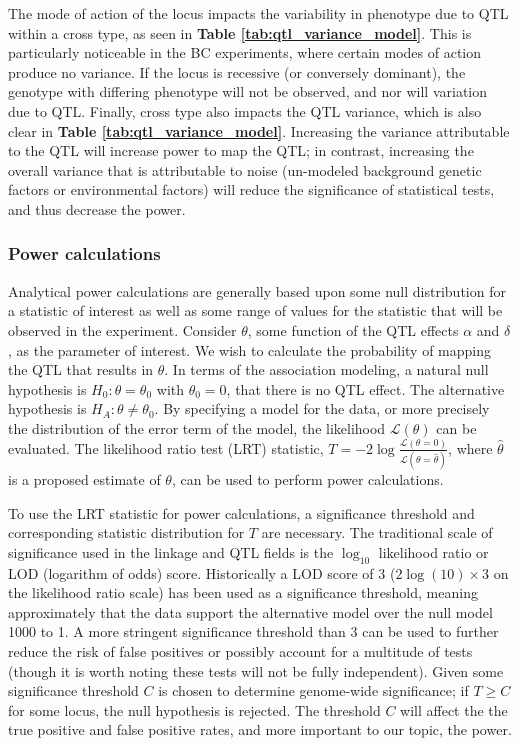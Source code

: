 The mode of action of the locus impacts the variability in phenotype due to QTL within a cross type, as seen in \textbf{Table \ref{tab:qtl_variance_model}}. This is particularly noticeable in the BC experiments, where certain modes of action produce no variance. If the locus is recessive (or conversely dominant), the genotype with differing phenotype will not be observed, and nor will variation due to QTL. Finally, cross type also impacts the QTL variance, which is also clear in \textbf{Table \ref{tab:qtl_variance_model}}. Increasing the variance attributable to the QTL will increase power to map the QTL; in contrast, increasing the overall variance that is attributable to noise (un-modeled background genetic factors or environmental factors) will reduce the significance of statistical tests, and thus decrease the power.


\subsubsection{Power calculations} 

Analytical power calculations are generally based upon some null distribution for a statistic of interest as well as some range of values for the statistic that will be observed in the experiment. Consider $\theta$, some function of the QTL effects $\alpha$ and $\delta$, as the parameter of interest. We wish to calculate the probability of mapping the QTL that results in $\theta$. In terms of the association modeling, a natural null hypothesis is $H_{0}: \theta = \theta_{0}$ with $\theta_{0} = 0$, that there is no QTL effect. The alternative hypothesis is $H_{A}: \theta \neq \theta_{0}$. By specifying a model for the data, or more precisely the distribution of the error term of the model, the likelihood $\mathcal{L}(\theta)$ can be evaluated. The likelihood ratio test (LRT) statistic, $T = -2\log\frac{\mathcal{L}(\theta = 0)}{\mathcal{L}(\theta = \widehat{\theta})}$, where $\widehat{\theta}$ is a proposed estimate of $\theta$, can be used to perform power calculations. 

To use the LRT statistic for power calculations, a significance threshold and corresponding statistic distribution for $T$ are necessary. The traditional scale of significance used in the linkage and QTL fields is the $\log_{10}$ likelihood ratio or LOD (logarithm of odds) score. Historically a LOD score of 3 ($2\log(10) \times 3$ on the likelihood ratio scale) has been used as a significance threshold, meaning approximately that the data support the alternative model over the null model 1000 to 1. A more stringent significance threshold than 3 can be used to further reduce the risk of false positives or possibly account for a multitude of tests (though it is worth noting these tests will not be fully independent). Given some significance threshold $C$ is chosen to determine genome-wide significance; if $T \ge C$ for some locus, the null hypothesis is rejected. The threshold $C$ will affect the the true positive and false positive rates, and more important to our topic, the power.

